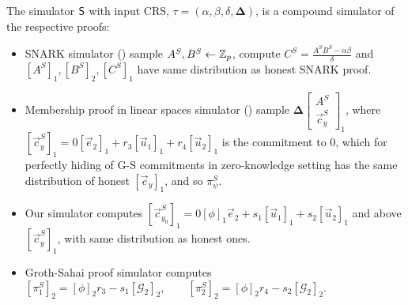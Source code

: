 The simulator $\mathsf{S}$ with input CRS, $\tau = (%
 \alpha, \beta,\delta, \mathbf{\Delta})$, is a compound simulator of the respective proofs:
\begin{itemize}
	\item SNARK simulator (\cite{EC:Groth16}) sample $A^S,B^S\gets \mathbb{Z}_p$, compute $C^S=\displaystyle\frac{A^S B^S-\alpha \beta}{\delta}$ and $[A^S]_1,[B^S]_2,[C^S]_1$ have same distribution as honest SNARK proof.
	\item Membership proof in linear spaces simulator (\cite{AC:GonHevRaf15}) sample
	$\mathbf{\Delta} \left[\begin{array}{c}
	A^S\\
	\vec{c}_y^S
	\end{array}\right]_1$, 
	where $[\vec{c}_y^S]_1=0[\vec{e}_2]_1+r_3[\vec{u}_1]_1+r_4[\vec{u}_2]_1$ is the commitment to $0$, which for perfectly hiding of G-S commitments in zero-knowledge setting has the same distribution of honest $[\vec{c}_y]_1$, and so $\pi_{\psi}^S$.
	\item Our simulator computes $[\vec{c}_{y_0}^S]_1=0[\phi]_1\vec{e}_2+s_1[\vec{u}_1]_1+s_2[\vec{u}_2]_1$ and above $[\vec{c}_y^S]_1$, with same distribution as honest ones.
	\item Groth-Sahai proof simulator \cite{EC:GroSah08} computes
	$[\pi_1^S]_2= [\phi]_2 r_3 -s_1[\mathcal{G}_2]_2, \quad \quad[\pi_2^S]_2=[\phi]_2 r_4 -s_2[\mathcal{G}_2]_2.$
\end{itemize}  

